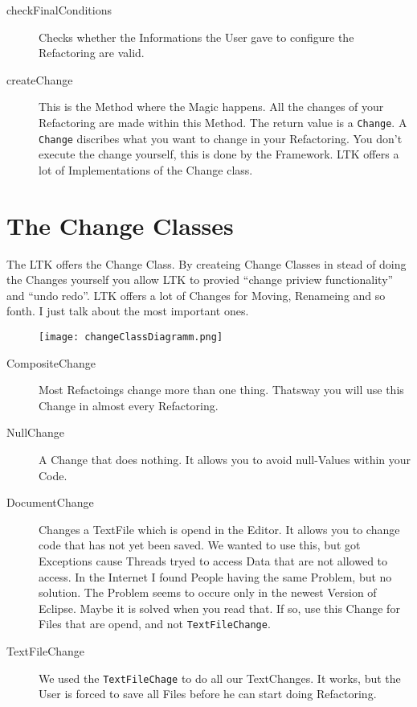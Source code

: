 \documentclass[a4paper,10pt]{report}
\begin{document}
\begin{description}
\begin{description}
\item[checkFinalConditions] Checks whether the Informations the User gave to configure the Refactoring are valid. 
\item[createChange] This is the Method where the Magic happens. All the changes of your Refactoring are made within this Method. The return value is a \verb!Change!. A \verb!Change!
discribes what you want to change in your Refactoring. You don't execute the change yourself, this is done by the Framework. LTK offers a lot of Implementations of the Change
class. 
\end{description}
\end{description}

\section{The Change Classes}
The LTK offers the Change Class. By createing Change Classes in stead of doing the Changes yourself you allow LTK to provied ``change priview functionality'' and ``undo redo''.
LTK offers a lot of Changes for Moving, Renameing and so fonth. I just talk about the most important ones.
\begin{figure}[h]
\centering
\texttt{[image: changeClassDiagramm.png]}
\end{figure}
\begin{description}
 \item[CompositeChange] Most Refactoings change more than one thing. Thatsway you will use this Change in almost every Refactoring.
 \item[NullChange] A Change that does nothing. It allows you to avoid null-Values within your Code.
 \item[DocumentChange] Changes a TextFile which is opend in the Editor. It allows you to change code that has not yet been saved. We wanted to use this, but got 
Exceptions cause Threads tryed to access Data that are not allowed to access. In the Internet I found People having the same Problem, but no solution. The Problem seems
to occure only in the newest Version of Eclipse. Maybe it is solved when you read that. If so, use this Change for Files that are opend, and not \verb!TextFileChange!.
 \item[TextFileChange] We used the \verb!TextFileChage! to do all our TextChanges. It works, but the User is forced to save all Files before he can start doing 
Refactoring. 
\end{description}
\end{document}
